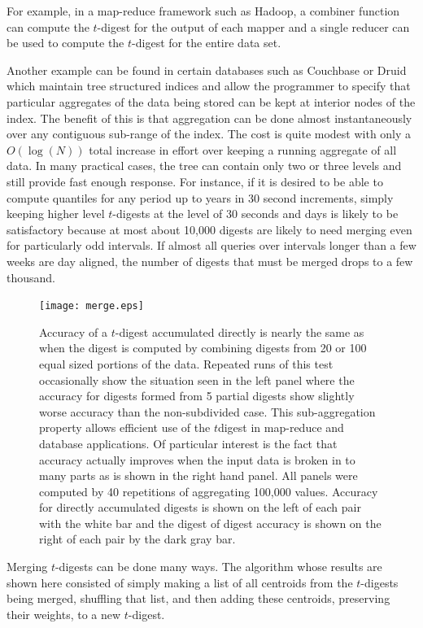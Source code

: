 \documentclass[11pt]{amsart}
\begin{document}
For example, in a map-reduce framework such as Hadoop, a combiner function can compute the $t$-digest for the output of each mapper and a single reducer can be used to compute the $t$-digest for the entire data set.  

Another example can be found in certain databases such as Couchbase or Druid which maintain tree structured indices and allow the programmer to specify that particular aggregates of the data being stored can be kept at interior nodes of the index.  The benefit of this is that aggregation can be done almost instantaneously over any contiguous sub-range of the index.  The cost is quite modest with only a $O(\log(N))$ total increase in effort over keeping a running aggregate of all data.  In many practical cases, the tree can contain only two or three levels and still provide fast enough response.  For instance, if it is desired to be able to compute quantiles for any period up to years in 30 second increments, simply keeping higher level $t$-digests at the level of 30 seconds and days is likely to be satisfactory because at most about 10,000 digests are likely to need merging even for particularly odd intervals.  If almost all queries over intervals longer than a few weeks are day aligned, the number of digests that must be merged drops to a few thousand.
\begin{figure}[htb] %
   \centering
   \texttt{[image: merge.eps]} 
   \caption{Accuracy of a $t$-digest accumulated directly is nearly the same as when the digest is computed by combining digests from 20 or 100 equal sized portions of the data.  Repeated runs of this test occasionally show the situation seen in the left panel where the accuracy for digests formed from 5 partial digests show slightly worse accuracy than the non-subdivided case.  This sub-aggregation property allows efficient use of the $t$digest in map-reduce and database applications.  Of particular interest is the fact that accuracy actually improves when the input data is broken in to many parts as is shown in the right hand panel.  All panels were computed by 40 repetitions of aggregating 100,000 values. Accuracy for directly accumulated digests is shown on the left of each pair with the white bar and the digest of digest accuracy is shown on the right of each pair by the dark gray bar.}
   \label{fig:merge}
\end{figure}

Merging $t$-digests can be done many ways.  The algorithm whose results are shown here consisted of simply making a list of all centroids from the $t$-digests being merged, shuffling that list, and then adding these centroids, preserving their weights, to a new $t$-digest.
\end{document}
